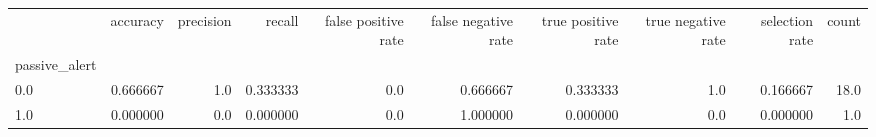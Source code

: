 \begin{tabular}{lrrrrrrrrr}
\toprule
{} &  accuracy &  precision &    recall &  false positive rate &  false negative rate &  true positive rate &  true negative rate &  selection rate &  count \\
passive\_alert &           &            &           &                      &                      &                     &                     &                 &        \\
\midrule
0.0           &  0.666667 &        1.0 &  0.333333 &                  0.0 &             0.666667 &            0.333333 &                 1.0 &        0.166667 &   18.0 \\
1.0           &  0.000000 &        0.0 &  0.000000 &                  0.0 &             1.000000 &            0.000000 &                 0.0 &        0.000000 &    1.0 \\
\bottomrule
\end{tabular}
